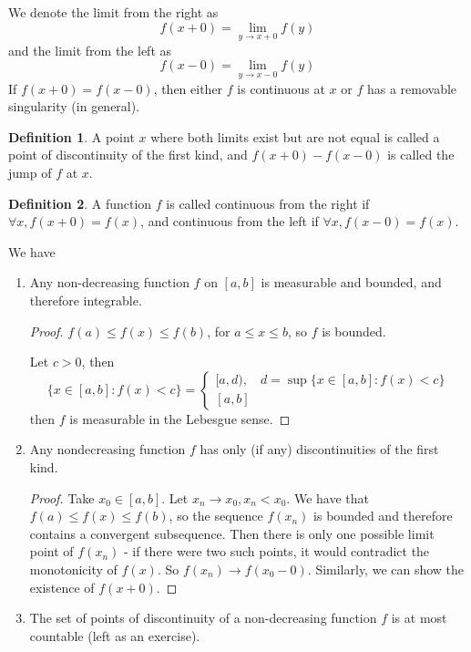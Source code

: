 \documentclass[11pt,a4paper]{report}
\theoremstyle{plain}
\theoremstyle{definition}
\newtheorem*{defn}{Definition}
\theoremstyle{remark}
\begin{document}
We denote the limit from the right as
$$ f(x + 0) = \lim_{y \rightarrow x + 0} f(y) $$
and the limit from the left as
$$ f(x - 0) = \lim_{y \rightarrow x - 0} f(y) $$
If $f(x + 0) = f(x - 0)$, then either $f$ is continuous at $x$ or $f$ has a removable singularity (in general).

\begin{defn}
    A point $x$ where both limits exist but are not equal is called a point of discontinuity of the first kind, and $f(x + 0) - f(x - 0)$ is called the jump of $f$ at $x$.
\end{defn}

\begin{defn}
    A function $f$ is called continuous from the right if $\forall x, f(x + 0) = f(x)$, and continuous from the left if $\forall x, f(x - 0) = f(x)$.
\end{defn}

We have
\begin{enumerate}
  \item Any non-decreasing function $f$ on $[a, b]$ is measurable and bounded, and therefore integrable.
    \begin{proof}
      $f(a) \le f(x) \le f(b)$, for $a \le x \le b$, so $f$ is bounded. 
        
        Let $c > 0$, then
        $$ 
        \{ x \in [a, b] : f(x) < c \} = \begin{cases}
          [a, d), & d = \sup\{x \in [a, b] : f(x) < c \} \\
          [a, b]
        \end{cases}
        $$
        then $f$ is measurable in the Lebesgue sense.
    \end{proof}
 \item Any nondecreasing function $f$ has only (if any) discontinuities of the first kind.
    \begin{proof}
        Take $x_0 \in [a, b]$. Let $x_n \rightarrow x_0, x_n < x_0$. We have that $f(a) \le f(x) \le f(b)$, so the sequence $f(x_n)$ is bounded and therefore contains a convergent subsequence. Then there is only one possible limit point of $f(x_n)$ - if there were two such points, it would contradict the monotonicity of $f(x)$. So $f(x_n) \rightarrow f(x_0 - 0)$. Similarly, we can show the existence of $f(x + 0)$.
    \end{proof}
  \item The set of points of discontinuity of a non-decreasing function $f$ is at most countable (left as an exercise).
\end{enumerate}
\end{document}
